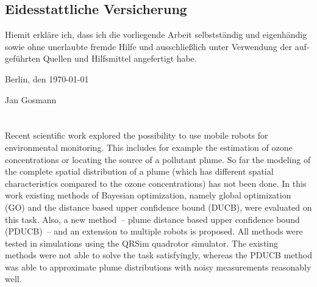 \documentclass[11pt,a4paper,twoside,BCOR=15mm,listof=totoc,parskip=never]{scrbook}
\begin{document}
\thispagestyle{empty}
\begin{german}
    \vspace*{\fill}
    \section*{Eidesstattliche Versicherung}
    \noindent Hiemit erkläre ich, dass ich die vorliegende Arbeit selbstständig 
    und eigenhändig sowie ohne unerlaubte fremde Hilfe und ausschließlich unter 
    Verwendung der aufgeführten Quellen und Hilfsmittel angefertigt habe.

    \vspace{\intextsep}
    \noindent Berlin, den \today

    \vspace{\intextsep}
    \vspace{\intextsep}
    \noindent Jan Gosmann
    \vspace*{\fill}
    \vspace*{\fill}
\end{german}

\cleardoublepage\thispagestyle{empty}
\vspace*{\fill}
\section*{\abstractname}
Recent scientific work explored the possibility to use mobile robots for 
environmental monitoring. This includes for example the estimation of ozone 
concentrations or locating the source of a pollutant plume. So far the modeling 
of the complete spatial distribution of a plume (which has different spatial 
characteristics compared to the ozone concentrations) has not been done.  In 
this work existing methods of Bayesian optimization, namely global optimization 
(GO) and the distance based upper confidence bound (DUCB), were evaluated on 
this task.  Also, a new method~-- plume distance based upper confidence bound 
(PDUCB)~-- and an extension to multiple robots is proposed.  All methods were 
tested in simulations using the QRSim quadrotor simulator. The existing methods 
were not able to solve the task satisfyingly, whereas the PDUCB method was able 
to approximate plume distributions with noisy measurements reasonably well.
\end{document}
